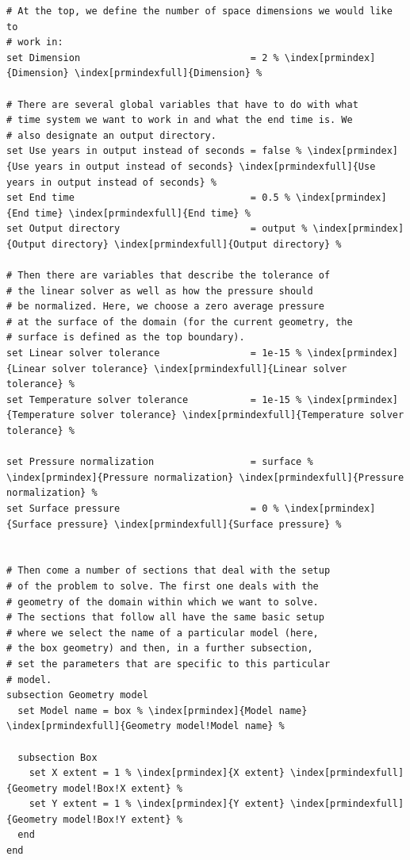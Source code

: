 \documentclass{article}
\begin{document}
\begin{lstlisting}[frame=single,language=prmfile,escapechar=\%]
# At the top, we define the number of space dimensions we would like to
# work in:
set Dimension                              = 2 % \index[prmindex]{Dimension} \index[prmindexfull]{Dimension} %

# There are several global variables that have to do with what
# time system we want to work in and what the end time is. We
# also designate an output directory.
set Use years in output instead of seconds = false % \index[prmindex]{Use years in output instead of seconds} \index[prmindexfull]{Use years in output instead of seconds} %
set End time                               = 0.5 % \index[prmindex]{End time} \index[prmindexfull]{End time} %
set Output directory                       = output % \index[prmindex]{Output directory} \index[prmindexfull]{Output directory} %

# Then there are variables that describe the tolerance of
# the linear solver as well as how the pressure should
# be normalized. Here, we choose a zero average pressure
# at the surface of the domain (for the current geometry, the
# surface is defined as the top boundary).
set Linear solver tolerance                = 1e-15 % \index[prmindex]{Linear solver tolerance} \index[prmindexfull]{Linear solver tolerance} %
set Temperature solver tolerance           = 1e-15 % \index[prmindex]{Temperature solver tolerance} \index[prmindexfull]{Temperature solver tolerance} %

set Pressure normalization                 = surface % \index[prmindex]{Pressure normalization} \index[prmindexfull]{Pressure normalization} %
set Surface pressure                       = 0 % \index[prmindex]{Surface pressure} \index[prmindexfull]{Surface pressure} %


# Then come a number of sections that deal with the setup
# of the problem to solve. The first one deals with the
# geometry of the domain within which we want to solve.
# The sections that follow all have the same basic setup
# where we select the name of a particular model (here,
# the box geometry) and then, in a further subsection,
# set the parameters that are specific to this particular
# model.
subsection Geometry model
  set Model name = box % \index[prmindex]{Model name} \index[prmindexfull]{Geometry model!Model name} %

  subsection Box
    set X extent = 1 % \index[prmindex]{X extent} \index[prmindexfull]{Geometry model!Box!X extent} %
    set Y extent = 1 % \index[prmindex]{Y extent} \index[prmindexfull]{Geometry model!Box!Y extent} %
  end
end



\end{lstlisting}
\end{document}
